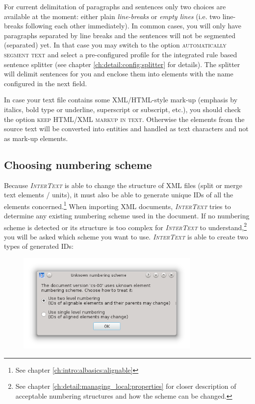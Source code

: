 \documentclass[a4paper,10pt,oneside]{book}
\newcommand{\IT}{\textit{\textsc{InterText}}\xspace}
\newcommand{\menu}[1]{\textsc{#1}}
\begin{document}
For current delimitation of paragraphs and sentences only two choices are available at the moment: either plain \emph{line-breaks} or \emph{empty lines} (i.e. two line-breaks following each other immediately). In common cases, you will only have paragraphs separated by line breaks and the sentences will not be segmented (separated) yet. In that case you may switch to the option \menu{automatically segment text} and select a pre-configured profile for the integrated rule based sentence splitter (see chapter \ref{ch:detail:config:splitter} for details). The splitter will delimit sentences for you and enclose them into elements with the name configured in the next field.

In case your text file contains some XML/HTML-style mark-up (emphasis by italics, bold type or underline, superscript or subscript, etc.), you should check the option \menu{keep HTML/XML markup in text}. Otherwise the elements from the source text will be converted into entities and handled as text characters and not as mark-up elements.

\subsection{Choosing numbering scheme}\label{ch:detail:managing_local:new:numbering}

Because \IT is able to change the structure of XML files (split or merge text elements / units), it must also be able to generate unique IDs of all the elements concerned.\footnote{See chapter \ref{ch:intro:albasics:alignable}} When importing XML documents, \IT tries to determine any existing numbering scheme used in the document. If no numbering scheme is detected or its structure is too complex for \IT to understand,\footnote{See chapter \ref{ch:detail:managing_local:properties} for closer description of acceptable numbering structures and how the scheme can be changed.} you will be asked which scheme you want to use. \IT is able to create two types of generated IDs:

\begin{figure}[htb]
 \includegraphics[width=0.8\textwidth]{screenshots/numbering_dialog.png}
\end{figure}
\end{document}
